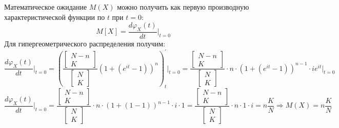 \documentclass[a4paper, 12pt]{article}
\begin{document}
    Математическое ожидание $M(X)$ можно получить как первую производную характеристической функции по $t$ при $t=0$:
    $$
    M[X]=\dfrac{d\varphi_X(t)}{dt}\bigg|_{t=0}
    $$
    Для гипергеометрического распределения получим:
    $$
    \dfrac{d\varphi_X(t)}{dt}\bigg|_{t=0}=
    \left(\dfrac{\begin{bmatrix}N-n\\K\end{bmatrix}}{\begin{bmatrix}N\\K\end{bmatrix}}(1+(e^{it}-1))^n\right)^{\prime}_t \Bigg|_{t=0}=
    \dfrac{
        \begin{bmatrix}
            N-n\\
            K
        \end{bmatrix}
    }{
        \begin{bmatrix}
            N\\
            K
        \end{bmatrix}
    }
    \cdot n \cdot (1+(e^{it}-1))^{n-1}\cdot ie^{it}\Bigg|_{t=0}
    $$
    $$
    \dfrac{d\varphi_X(t)}{dt}\bigg|_{t=0}=
    \dfrac{
        \begin{bmatrix}
            N-n\\
            K
        \end{bmatrix}
    }{
        \begin{bmatrix}
            N\\
            K
        \end{bmatrix}
    }
    \cdot n \cdot (1+(1-1))^{n-1}\cdot i\cdot 1=
    \dfrac{
        \begin{bmatrix}
            N-n\\
            K
        \end{bmatrix}
    }{
        \begin{bmatrix}
            N\\
            K
        \end{bmatrix}
    }\cdot n \cdot 1 \cdot i =n\dfrac{K}{N}\Rightarrow
    M(X)=n\dfrac{K}{N}
    $$
\end{document}
